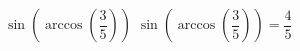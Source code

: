  {$\sin\left(\arccos\left(\dfrac{3}{5}\right)\right)$}
{ $\sin\left(\arccos\left(\dfrac{3}{5}\right)\right) = \dfrac{4}{5}$}
